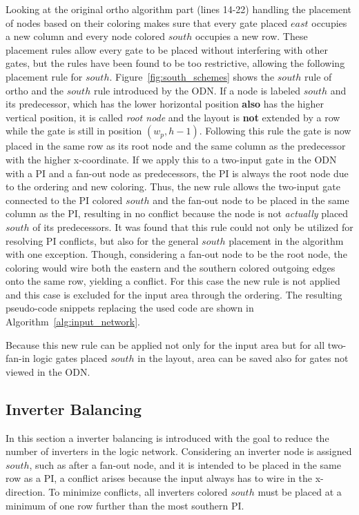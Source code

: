 Looking at the original ortho algorithm part (lines 14-22) handling the placement of nodes based on their coloring makes sure that every gate placed $east$ occupies a new column and every node colored $south$ occupies a new row. These placement rules allow every gate to be placed without interfering with other gates, but the rules have been found to be too restrictive, allowing the following placement rule for $south$. Figure~\ref{fig:south_schemes} shows the $south$ rule of ortho and the $south$ rule introduced by the ODN. If a node is labeled $south$ and its predecessor, which has the lower horizontal position \textbf{also} has the higher vertical position, it is called \emph{root node} and the layout is \textbf{not} extended by a row while the gate is still in position $(w_p, h-1)$. Following this rule the gate is now placed in the same row as its root node and the same column as the predecessor with the higher x-coordinate. If we apply this to a two-input gate in the ODN with a PI and a fan-out node as predecessors, the PI is always the root node due to the ordering and new coloring. Thus, the new rule allows the two-input gate connected to the PI colored $south$ and the fan-out node to be placed in the same column as the PI, resulting in no conflict because the node is not \textit{actually} placed $south$ of its predecessors. It was found that this rule could not only be utilized for resolving PI conflicts, but also for the general $south$ placement in the algorithm with one exception. Though, considering a fan-out node to be the root node, the coloring would wire both the eastern and the southern colored outgoing edges onto the same row, yielding a conflict. For this case the new rule is not applied and this case is excluded for the input area through the ordering. The resulting pseudo-code snippets replacing the used code are shown in Algorithm~\ref{alg:input_network}.

Because this new rule can be applied not only for the input area but for all two-fan-in logic gates placed $south$ in the layout, area can be saved also for gates not viewed in the ODN.

\subsection{Inverter Balancing}\label{subsec:invblc}

In this section a inverter balancing is introduced with the goal to reduce the number of inverters in the logic network. Considering an inverter node is assigned $south$, such as after a fan-out node, and it is intended to be placed in the same row as a PI, a conflict arises because the input always has to wire in the x-direction. To minimize conflicts, all inverters colored $south$ must be placed at a minimum of one row further than the most southern PI.

